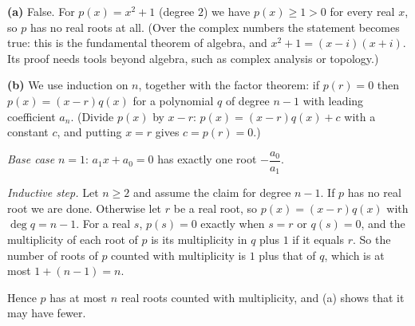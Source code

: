 \textbf{(a)} False. For $p(x)=x^2+1$ (degree $2$) we have $p(x)\ge1>0$ for every real $x$, so $p$ has no real roots at all. (Over the complex numbers the statement becomes true: this is the fundamental theorem of algebra, and $x^2+1=(x-i)(x+i)$. Its proof needs tools beyond algebra, such as complex analysis or topology.)

\textbf{(b)} We use induction on $n$, together with the factor theorem: if $p(r)=0$ then $p(x)=(x-r)q(x)$ for a polynomial $q$ of degree $n-1$ with leading coefficient $a_n$. (Divide $p(x)$ by $x-r$: $p(x)=(x-r)q(x)+c$ with a constant $c$, and putting $x=r$ gives $c=p(r)=0$.)

\emph{Base case} $n=1$: $a_1x+a_0=0$ has exactly one root $-\dfrac{a_0}{a_1}$.

\emph{Inductive step.} Let $n\ge2$ and assume the claim for degree $n-1$. If $p$ has no real root we are done. Otherwise let $r$ be a real root, so $p(x)=(x-r)q(x)$ with $\deg q=n-1$. For a real $s$, $p(s)=0$ exactly when $s=r$ or $q(s)=0$, and the multiplicity of each root of $p$ is its multiplicity in $q$ plus $1$ if it equals $r$. So the number of roots of $p$ counted with multiplicity is $1$ plus that of $q$, which is at most $1+(n-1)=n$.

Hence $p$ has at most $n$ real roots counted with multiplicity, and (a) shows that it may have fewer.
